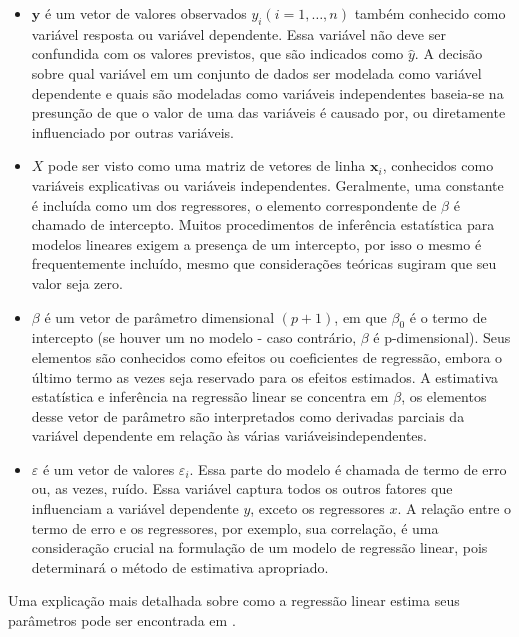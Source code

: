 \begin{itemize}
	\item $ \mathbf {y} $ é um vetor de valores observados $ y_{i} (i = 1, \ldots, n) $ também conhecido como variável resposta ou variável dependente. Essa variável não deve ser confundida com os valores previstos, que são indicados como $ \hat{y} $. A decisão sobre qual variável em um conjunto de dados ser modelada como variável dependente e quais são modeladas como variáveis ​​independentes baseia-se na presunção de que o valor de uma das variáveis ​​é causado por, ou diretamente influenciado por outras variáveis.

	\item $ X $ pode ser visto como uma matriz de vetores de linha $ \mathbf {x}_{i} $, conhecidos como variáveis ​​explicativas ou variáveis ​​independentes. Geralmente, uma constante é incluída como um dos regressores, o elemento correspondente de $ \beta $ é chamado de intercepto. Muitos procedimentos de inferência estatística para modelos lineares exigem a presença de um intercepto, por isso o mesmo é frequentemente incluído, mesmo que considerações teóricas sugiram que seu valor seja zero.

	\item $ \beta $ é um vetor de parâmetro dimensional $ (p + 1) $, em que $ \beta_{0} $ é o termo de intercepto (se houver um no modelo - caso contrário, $ \beta $ é p-dimensional). Seus elementos são conhecidos como efeitos ou coeficientes de regressão, embora o último termo as vezes seja reservado para os efeitos estimados. A estimativa estatística e inferência na regressão linear se concentra em $ \beta $, os elementos desse vetor de parâmetro são interpretados como derivadas parciais da variável dependente em relação às várias variáveis ​​independentes.

	\item $ \varepsilon $ é um vetor de valores $ \varepsilon_{i} $. Essa parte do modelo é chamada de termo de erro ou, as vezes, ruído. Essa variável captura todos os outros fatores que influenciam a variável dependente $ y $, exceto os regressores $ x $. A relação entre o termo de erro e os regressores, por exemplo, sua correlação, é uma consideração crucial na formulação de um modelo de regressão linear, pois determinará o método de estimativa apropriado.
\end{itemize}

Uma explicação mais detalhada sobre como a regressão linear estima seus parâmetros pode ser encontrada em \citet{Freedman2009}.


